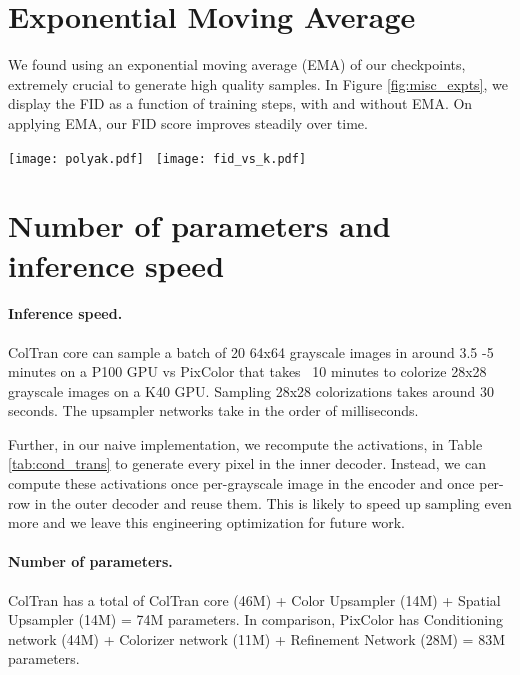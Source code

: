 \documentclass{article} \usepackage{iclr2021_conference,times}
\begin{document}
\section{Exponential Moving Average}
\label{fid:ema}
We found using an exponential moving average (EMA) of our checkpoints, extremely crucial to generate high quality samples. In Figure \ref{fig:misc_expts}, we display the FID as a function of training steps, with and without EMA. On applying EMA, our FID score improves steadily over time.


\begin{figure*}
\centering
\texttt{[image: polyak.pdf]} \,
\texttt{[image: fid\_vs\_k.pdf]}
\caption{\textbf{Left}: FID vs training steps, with and without polyak averaging. \textbf{Right}: The effect of K in top-K sampling on FID. See Appendix ~\ref{fid:ema} and ~\ref{fid:topk}}
\label{fig:misc_expts}
\end{figure*}

\section{Number of parameters and inference speed}

\paragraph{Inference speed.} ColTran core can sample a batch of 20 64x64 grayscale images in around 3.5 -5 minutes on a P100 GPU vs PixColor that takes ~10 minutes to colorize 28x28 grayscale images on a K40 GPU. Sampling 28x28 colorizations takes around 30 seconds. The upsampler networks take in the order of milliseconds.

Further, in our naive implementation, we recompute the activations,  in Table \ref{tab:cond_trans} to generate every pixel in the inner decoder. Instead, we can compute these activations once per-grayscale image in the encoder and once per-row in the outer decoder and reuse them. This is likely to speed up sampling even more and we leave this engineering optimization for future work.


\paragraph{Number of parameters.}
ColTran has a total of ColTran core (46M) + Color Upsampler (14M) + Spatial Upsampler (14M) = 74M parameters. In comparison, PixColor has Conditioning network (44M) + Colorizer network (11M) + Refinement Network (28M) = 83M parameters.
\end{document}
